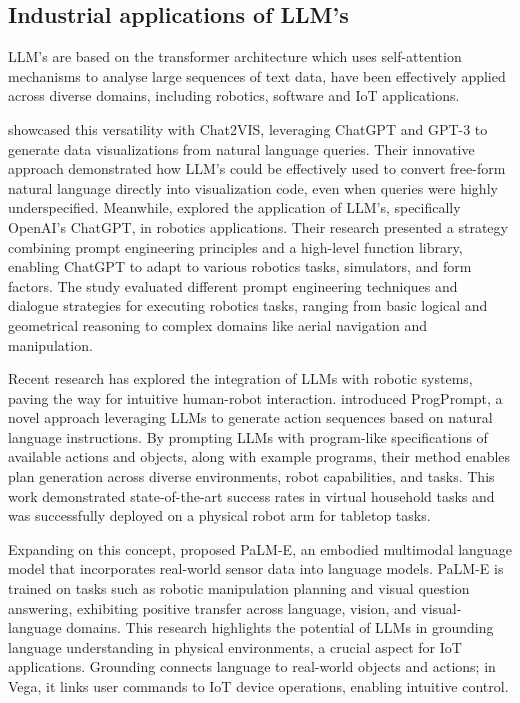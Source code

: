 \documentclass{ieeeaccess}
\begin{document}
\subsection{Industrial applications of LLM's}
LLM's are based on the transformer architecture \cite{DBLP:journals/corr/VaswaniSPUJGKP17} which uses self-attention mechanisms to analyse large sequences of text data, have been effectively applied across diverse domains, including robotics, software and IoT applications. 

\citet{10121440} showcased this versatility with Chat2VIS, leveraging ChatGPT and GPT-3 to generate data visualizations from natural language queries. Their innovative approach demonstrated how LLM's could be effectively used to convert free-form natural language directly into visualization code, even when queries were highly underspecified. Meanwhile, \citet{10500490} explored the application of LLM's, specifically OpenAI's ChatGPT, in robotics applications. Their research presented a strategy combining prompt engineering principles and a high-level function library, enabling ChatGPT to adapt to various robotics tasks, simulators, and form factors. The study evaluated different prompt engineering techniques and dialogue strategies for executing robotics tasks, ranging from basic logical and geometrical reasoning to complex domains like aerial navigation and manipulation.

Recent research has explored the integration of LLMs with robotic systems, paving the way for intuitive human-robot interaction. \citet{Singh2023} introduced ProgPrompt, a novel approach leveraging LLMs to generate action sequences based on natural language instructions. By prompting LLMs with program-like specifications of available actions and objects, along with example programs, their method enables plan generation across diverse environments, robot capabilities, and tasks. This work demonstrated state-of-the-art success rates in virtual household tasks and was successfully deployed on a physical robot arm for tabletop tasks.

Expanding on this concept, \citet{10.5555/3618408.3618748} proposed PaLM-E, an embodied multimodal language model that incorporates real-world sensor data into language models. PaLM-E is trained on tasks such as robotic manipulation planning and visual question answering, exhibiting positive transfer across language, vision, and visual-language domains. This research highlights the potential of LLMs in grounding language understanding in physical environments, a crucial aspect for IoT applications. Grounding connects language to real-world objects and actions; in Vega, it links user commands to IoT device operations, enabling intuitive control.
\end{document}
